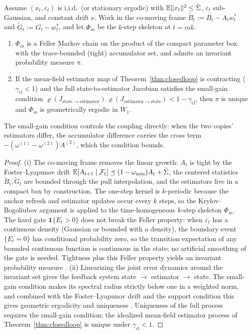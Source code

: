 \begin{proposition}
\label{prop:ergodic}
Assume $(x_t,\varepsilon_t)$ is i.i.d.\ (or stationary ergodic) with $\mathbb{E}\|x_t\|^2 \le \bar\Sigma$, $\varepsilon_t$ sub-Gaussian, and constant drift $\nu$.
Work in the co-moving frame $\tilde B_t := B_t - A_t w^*_t$ and $\tilde G_t := G_t - w^*_t$, and let $\Phi_m$ be the $k$-step skeleton at $t = mk$.
\begin{enumerate}
\item[(i)] $\Phi_m$ is a Feller Markov chain on the product of the compact parameter box with the trace-bounded (tight) accumulator set, and admits an invariant probability measure $\pi$.
\item[(ii)] \sloppy If the mean-field estimator map of Theorem~\ref{thm:closedloop} is contracting ($\gamma_{\mathrm{cl}}<1$) and the full state-to-estimator Jacobian satisfies the small-gain condition $\varrho(J_{\mathrm{state}\to\mathrm{estimator}})\,\varrho(J_{\mathrm{estimator}\to\mathrm{state}}) < 1-\gamma_{\mathrm{cl}}$, then $\pi$ is unique and $\Phi_m$ is geometrically ergodic in $W_1$.
\end{enumerate}
The small-gain condition controls the coupling directly: when the two copies' estimators differ, the accumulator difference carries the cross term $-(\omega^{(1)}-\omega^{(2)})A^{(2)}$, which the condition bounds.
\end{proposition}
\begin{proof}
(i) The co-moving frame removes the linear growth: $A_t$ is tight by the Foster--Lyapunov drift $\mathbb{E}[A_{t+1}\mid\mathcal F_t]\preceq(1-\omega_{\min})A_t+\bar\Sigma$, the centered statistics $\tilde B_t,\tilde G_t$ are bounded through the pull interpolation, and the estimators live in a compact box by construction.
The one-step kernel is $k$-periodic because the anchor refresh and estimator updates occur every $k$ steps, so the Krylov--Bogoliubov argument \citep{meyn2009} is applied to the time-homogeneous $k$-step skeleton $\Phi_m$.
The hard gate $\mathbf 1\{E_t>0\}$ does not break the Feller property: when $\varepsilon_t$ has a continuous density (Gaussian or bounded with a density), the boundary event $\{E_t=0\}$ has conditional probability zero, so the transition expectation of any bounded continuous function is continuous in the state; no artificial smoothing of the gate is needed.
Tightness plus this Feller property yields an invariant probability measure \citep{meyn2009}.
(ii) Linearizing the joint error dynamics around the invariant set gives the feedback system state $\to$ estimator $\to$ state. The small-gain condition makes its spectral radius strictly below one in a weighted norm, and combined with the Foster--Lyapunov drift and the support condition this gives geometric ergodicity and uniqueness \citep[Ch.~18]{meyn2009}.
Uniqueness of the full process requires the small-gain condition; the idealized mean-field estimator process of Theorem~\ref{thm:closedloop} is unique under $\gamma_{\mathrm{cl}}<1$.
\end{proof}

